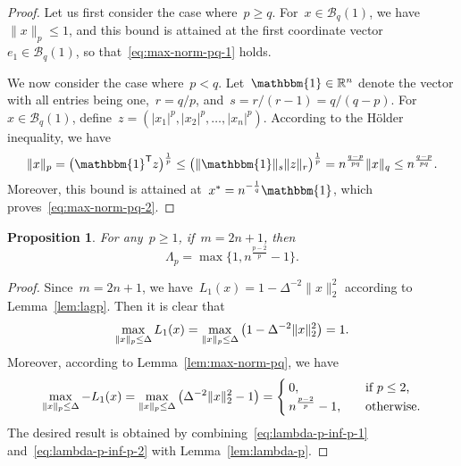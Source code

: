 \documentclass[draft]{article}
\numberwithin{equation}{section}
\theoremstyle{definition}
\theoremstyle{plain}
\newtheorem{proposition}{Proposition}[section]
\theoremstyle{remark}
\newcommand*{\abs}[2][]{#1\lvert#2#1\rvert}
\newcommand*{\lagp}[1][]{L\ifblank{#1}{}{_{#1}}}
\newcommand*{\norm}[2][]{#1\lVert#2#1\rVert}
\newcommand*{\R}{\mathbb{R}}
\newcommand*{\set}[2][]{#1\{#2#1\}}
\newcommand*{\T}{\mathsf{T}}
\newcommand{\ones}{\mathbbm{1}}
\begin{document}
\begin{proof}
    Let us first consider the case where~$p \ge q$.
    For~$x \in \mathcal{B}_q(1)$, we have~$\norm{x}_p \le 1$, and this bound is attained at the first coordinate vector~$e_1 \in \mathcal{B}_q(1)$, so that~\eqref{eq:max-norm-pq-1} holds.

    We now consider the case where~$p < q$.
    Let~$\ones \in \R^n$ denote the vector with all entries being one,~$r = q/p$, and~$s = r / (r - 1) = q / (q - p)$.
    For~$x \in \mathcal{B}_q(1)$, define~$z = (\abs{x_1}^p, \abs{x_2}^p, \dots, \abs{x_n}^p)$.
    According to the H{\"{o}}lder inequality, we have
    \begin{equation*}
        \norm{x}_p  = \big(\ones^{\T} z \big)^{\frac{1}{p}} \le \big(\norm{\ones}_s \norm{z}_r \big)^{\frac{1}{p}} = n^{\frac{q - p}{pq}} \norm{x}_q \le n^{\frac{q - p}{pq}}.
    \end{equation*}
    Moreover, this bound is attained at~$x^\ast = n^{-\frac{1}{q}}\ones$, which proves~\eqref{eq:max-norm-pq-2}.
\end{proof}

\begin{proposition}
    \label{prop:lambda-p-opt}
    For any~$p \ge 1$, if~$m = 2n + 1$, then
    \begin{equation*}
        \Lambda_p = \max \set[\big]{1, n^{\frac{p - 2}{p}} - 1}.
    \end{equation*}
\end{proposition}

\begin{proof}
    Since~$m = 2n+1$, we have~$L_1(x) = 1- \Delta^{-2}\norm{x}_2^2$ according to Lemma~\ref{lem:lagp}.
    Then it is clear that
    \begin{equation}
        \label{eq:lambda-p-inf-p-1}
        \max_{\norm{x}_p \le \Delta} \lagp[1](x) = \max_{\norm{x}_p \le \Delta} \big( 1 - \Delta^{-2}{\norm{x}_2^2} \big) = 1.
    \end{equation}
    Moreover, according to Lemma~\ref{lem:max-norm-pq}, we have
    \begin{equation}
        \label{eq:lambda-p-inf-p-2}
        \max_{\norm{x}_p \le \Delta} -\lagp[1](x) = \max_{\norm{x}_p \le \Delta} \big( \Delta^{-2} {\norm{x}_2^2} - 1 \big) =
        \begin{cases}
            0,                          & \quad \text{if~$p \le 2$,}\\
            n^{\frac{p - 2}{p}} - 1,    & \quad \text{otherwise.}
        \end{cases}
    \end{equation}
    The desired result is obtained by combining~\eqref{eq:lambda-p-inf-p-1} and~\eqref{eq:lambda-p-inf-p-2} with Lemma~\ref{lem:lambda-p}.
\end{proof}
\end{document}
